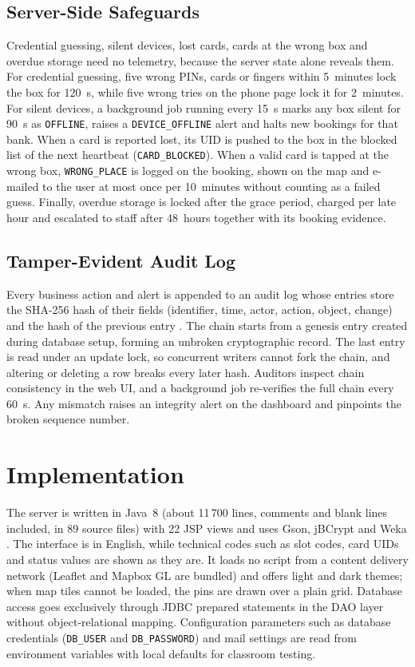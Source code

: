 \documentclass[journal,onecolumn]{IEEEtran}
\begin{document}
\subsection{Server-Side Safeguards}

Credential guessing, silent devices, lost cards, cards at the wrong box and overdue storage need no telemetry, because
the server state alone reveals them. For credential guessing, five wrong PINs, cards or fingers within 5~minutes lock
the box for 120~s, while five wrong tries on the phone page lock it for 2~minutes. For silent devices, a background job
running every 15~s marks any box silent for 90~s as \texttt{OFFLINE}, raises a \texttt{DEVICE\_OFFLINE} alert and halts
new bookings for that bank. When a card is reported lost, its UID is pushed to the box in the blocked list of the next
heartbeat (\texttt{CARD\_BLOCKED}). When a valid card is tapped at the wrong box, \texttt{WRONG\_PLACE} is logged on the
booking, shown on the map and e-mailed to the user at most once per 10~minutes without counting as a failed guess.
Finally, overdue storage is locked after the grace period, charged per late hour and escalated to staff after 48~hours
together with its booking evidence.

\subsection{Tamper-Evident Audit Log}

Every business action and alert is appended to an audit log whose entries store the SHA-256 hash of their fields
(identifier, time, actor, action, object, change) and the hash of the previous entry \cite{haber1991timestamp}. The
chain starts from a genesis entry created during database setup, forming an unbroken cryptographic record. The last
entry is read under an update lock, so concurrent writers cannot fork the chain, and altering or deleting a row breaks
every later hash. Auditors inspect chain consistency in the web UI, and a background job re-verifies the full chain
every 60~s. Any mismatch raises an integrity alert on the dashboard and pinpoints the broken sequence number.

\section{Implementation}

The server is written in Java~8 (about 11\,700 lines, comments and blank lines included, in 89 source files) with
22 JSP views and uses Gson, jBCrypt \cite{provos1999bcrypt} and Weka \cite{hall2009weka}. The interface is in English,
while technical codes such as slot codes, card UIDs and status values are shown as they are. It loads no script from a
content delivery network (Leaflet and Mapbox GL are bundled) and offers light and dark themes; when map tiles cannot be
loaded, the pins are drawn over a plain grid. Database access goes exclusively through JDBC prepared statements in the
DAO layer without object-relational mapping. Configuration parameters such as database credentials (\texttt{DB\_USER}
and \texttt{DB\_PASSWORD}) and mail settings are read from environment variables with local defaults for classroom
testing.
\end{document}
